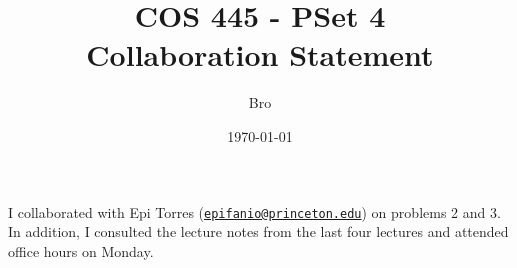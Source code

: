 \documentclass[12pt]{article}%
\begin{document}
\title{COS 445 - PSet 4 \\ Collaboration Statement} %
\author{Bro} %
\date{\today}
\maketitle

I collaborated with Epi Torres (\href{mailto:epifanio@princeton.edu}{\nolinkurl{epifanio@princeton.edu}}) on problems 2 and 3. In addition, I consulted the lecture notes from the last four lectures and attended office hours on Monday.
\end{document}
